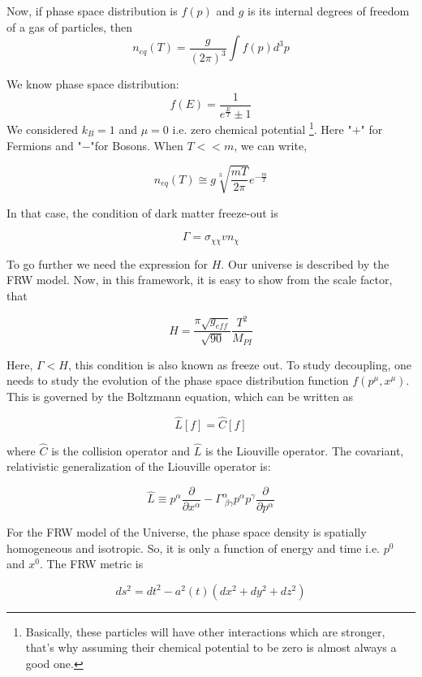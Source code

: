 \documentclass[12pt]{report}
\begin{document}
Now, if phase space distribution is $f(p)$ and $g$ is its internal degrees of freedom of a gas of particles, then $$n_{eq}(T)=\frac{g}{(2 \pi)^3} \int f(p)d^3p $$
	
	
	
We know phase space distribution: $$f(E)=\frac{1}{e^{\frac{E}{T}}\pm1}$$
  We considered $k_B=1$ and $\mu=0$ i.e. zero chemical potential \footnote{ Basically, these particles will have other interactions which are stronger, that's why assuming their chemical potential to be zero is almost always a good one.}. Here "$+$" for Fermions and "$-$"for Bosons.
  When $T<<m$, we can write,

  $$n_{eq}(T) \cong g\sqrt[3]{\frac{mT}{2 \pi}}e^{-\frac{m}{T}}$$

  In that case, the condition of dark matter freeze-out is 

  $$\Gamma=\sigma_{\chi \chi}v n_\chi$$

 
  To go further we need the expression for $H$. Our universe is described by the FRW model. Now, in this framework, it is easy to show from the scale factor, that 

  $$H=\frac{\pi\sqrt{g_{eff}}}{\sqrt{90}}\frac{T^2}{M_{PI}}$$ 

 
	
	
	
	
	
	
	
	

Here, $\Gamma < H$, this condition is also known as freeze out. To study decoupling, one needs to study the evolution of the phase space distribution function $f(p^\mu, x^\mu)$. This is governed by the Boltzmann equation, which can be written as 

$$\hat{L}[f]=\hat{C}[f]$$

where $\hat{C}$ is the collision operator and $\hat{L}$ is the Liouville operator. The covariant, relativistic generalization of the Liouville operator is:

\begin{equation}
\hat{L} \equiv p^\alpha \frac{\partial}{\partial x^\alpha}-\Gamma^\alpha_{\; \beta \gamma} p^\alpha p^\gamma \frac{\partial}{\partial p^\alpha}
\end{equation}

For the FRW model of the Universe, the phase space density is spatially homogeneous and isotropic. So, it is only a function of energy and time i.e. $p^0$ and   $x^0$. The FRW metric is 

$$ds^2=dt^2-a^2(t)(dx^2+dy^2+dz^2) $$ \cite{gwald}
\end{document}
